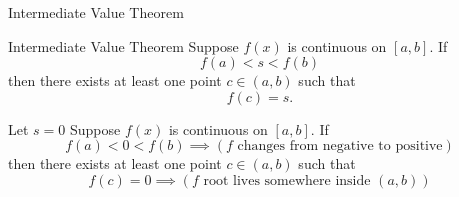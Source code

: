\documentclass[10pt]{beamer}
\begin{document}
\begin{frame}{Intermediate Value Theorem}

\begin{block}{Intermediate Value Theorem}
Suppose $f(x)$ is continuous on $[a,b]$. If
\[
f(a) < s < f(b)
\]
then there exists at least one point $c\in(a,b)$ such that
\[
f(c)=s.
\]
\end{block}

\vfill
\begin{block}{Let $s=0$}
Suppose $f(x)$ is continuous on $[a,b]$. If
\[
f(a) < 0 < f(b) \implies (f\text{ changes from negative to positive})
\]
then there exists at least one point $c\in(a,b)$ such that
\[
f(c)=0 \implies (f\text{ root lives somewhere inside }(a,b))
\]
\end{block}




\end{frame}
\end{document}
